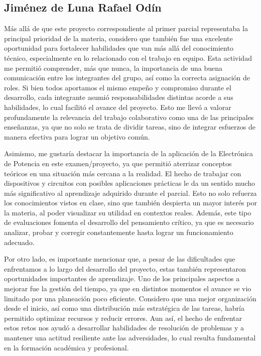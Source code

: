 \documentclass[12pt,a4paper]{article}
\begin{document}
\subsection*{Jiménez de Luna Rafael Odín}
Más allá de que este proyecto correspondiente al primer parcial representaba la principal prioridad de la materia, considero que también fue una excelente oportunidad para fortalecer habilidades que van más allá del conocimiento técnico, especialmente en lo relacionado con el trabajo en equipo. Esta actividad me permitió comprender, más que nunca, la importancia de una buena comunicación entre los integrantes del grupo, así como la correcta asignación de roles. Si bien todos aportamos el mismo empeño y compromiso durante el desarrollo, cada integrante asumió responsabilidades distintas acorde a sus habilidades, lo cual facilitó el avance del proyecto. Esto me llevó a valorar profundamente la relevancia del trabajo colaborativo como una de las principales enseñanzas, ya que no solo se trata de dividir tareas, sino de integrar esfuerzos de manera efectiva para lograr un objetivo común.

Asimismo, me gustaría destacar la importancia de la aplicación de la Electrónica de Potencia en este examen/proyecto, ya que permitió aterrizar conceptos teóricos en una situación más cercana a la realidad. El hecho de trabajar con dispositivos y circuitos con posibles aplicaciones prácticas le da un sentido mucho más significativo al aprendizaje adquirido durante el parcial. Esto no solo refuerza los conocimientos vistos en clase, sino que también despierta un mayor interés por la materia, al poder visualizar su utilidad en contextos reales. Además, este tipo de evaluaciones fomenta el desarrollo del pensamiento crítico, ya que es necesario analizar, probar y corregir constantemente hasta lograr un funcionamiento adecuado.

Por otro lado, es importante mencionar que, a pesar de las dificultades que enfrentamos a lo largo del desarrollo del proyecto, estas también representaron oportunidades importantes de aprendizaje. Uno de los principales aspectos a mejorar fue la gestión del tiempo, ya que en distintos momentos el avance se vio limitado por una planeación poco eficiente. Considero que una mejor organización desde el inicio, así como una distribución más estratégica de las tareas, habría permitido optimizar recursos y reducir errores. Aun así, el hecho de enfrentar estos retos nos ayudó a desarrollar habilidades de resolución de problemas y a mantener una actitud resiliente ante las adversidades, lo cual resulta fundamental en la formación académica y profesional.
\end{document}
